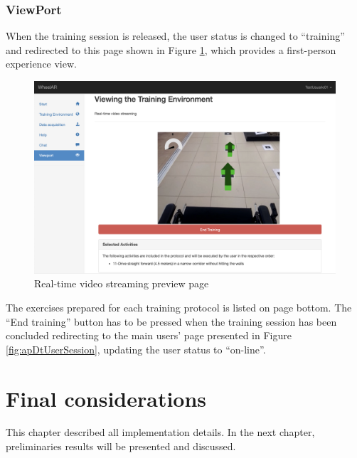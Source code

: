 \subsubsection{ViewPort} 

When the training session is released, the user status is changed to ``training''  and redirected to this page shown in Figure \ref{fig:apDtViewPortUser}, which provides a first-person experience view. 

\begin{figure}[!hbt]
\begin{center}
\includegraphics[width=1\linewidth]{img/apendiceD/tViewPortUser}
\caption{Real-time video streaming preview page} \label{fig:apDtViewPortUser}
\end{center}
\vspace{-15pt}
\end{figure}

The exercises prepared for each training protocol is listed on page bottom. The ``End training''  button has to be pressed when the training session has been concluded redirecting to the main users' page presented in Figure \ref{fig:apDtUserSession}, updating the user status to ``on-line''.


\section{Final considerations}

This chapter described all implementation details. In the next chapter, preliminaries results will be presented and discussed.